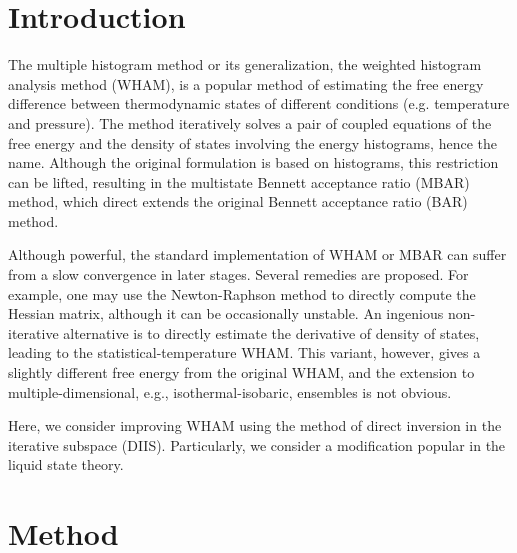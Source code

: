 \documentclass[aip,jcp,preprint,superscriptaddress]{revtex4-1}
\begin{document}
\newcommand{\vct}[1]{\mathbf{#1}}



\section{Introduction}



The multiple histogram method\cite{
ferrenberg1988, *ferrenberg1989}
or its generalization,
the weighted histogram analysis method (WHAM)\cite{
kumar1992, souaille2001, kastner2005,
chodera2007, bereau2009,
kim2011},
is a popular method of estimating
the free energy difference
between thermodynamic states
of different conditions (e.g. temperature and pressure).
%
The method iteratively solves a pair of coupled equations of
the free energy and the density of states
involving the energy histograms, hence the name.
%
Although the original formulation is
based on histograms,
this restriction can be lifted,
resulting in the
multistate Bennett acceptance ratio (MBAR) method\cite{
shirts2008},
which direct extends the original
Bennett acceptance ratio (BAR) method\cite{
bennett1976}.



Although powerful,
the standard implementation of WHAM or MBAR can suffer from
a slow convergence in later stages.
%
Several remedies are proposed\cite{
 shirts2008, bereau2009, kim2011}.
%
For example, one may use the Newton-Raphson method
to directly compute the Hessian matrix\cite{
shirts2008},
although it can be occasionally unstable.
%
An ingenious non-iterative alternative
is to directly estimate the derivative of density of states,
leading to the statistical-temperature WHAM\cite{
kim2011}.
%
This variant, however, gives
a slightly different free energy from the original WHAM,
and the extension to multiple-dimensional,
e.g., isothermal-isobaric, ensembles
is not obvious.



Here, we consider improving WHAM using
the method of direct inversion in the iterative subspace (DIIS)\cite{
pulay1980, *pulay1982, *hamilton1986}.
%
Particularly, we consider a modification
popular in the liquid state theory\cite{
kovalenko1999, howard2011}.




\section{Method}
\end{document}
